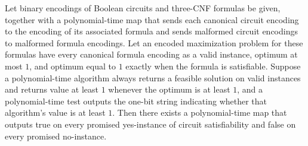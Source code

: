 \begin{theorem}
\label{FABL.EncodedMaxThreeSatModel.circuitSatDistinguisherOfOneOneApproximation}
\leanok
{}
Let binary encodings of Boolean circuits and three-CNF formulas be given, together with
a polynomial-time map that sends each canonical circuit encoding to the encoding of its
associated formula and sends malformed circuit encodings to malformed formula encodings.
Let an encoded maximization problem for these formulas have every canonical formula
encoding as a valid instance, optimum at most $1$, and optimum equal to $1$ exactly when
the formula is satisfiable. Suppose a polynomial-time algorithm always returns a
feasible solution on valid instances and returns value at least $1$ whenever the optimum
is at least $1$, and a polynomial-time test outputs the one-bit string indicating
whether that algorithm's value is at least $1$. Then there exists a polynomial-time map
that outputs true on every promised yes-instance of circuit satisfiability and false on
every promised no-instance.
\end{theorem}
